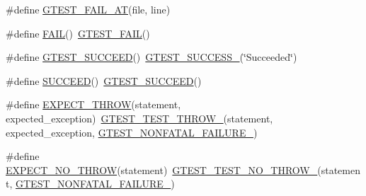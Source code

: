 \begin{DoxyCompactItemize}
\#define \mbox{\hyperlink{googletest-master_2googletest_2include_2gtest_2gtest_8h_acf5a3e2510baccc1a0eccb72da510d98}{G\+T\+E\+S\+T\+\_\+\+F\+A\+I\+L\+\_\+\+AT}}(file,  line)
\item 
\#define \mbox{\hyperlink{googletest-master_2googletest_2include_2gtest_2gtest_8h_a3e26a8d27caa386ed0ea7ce9d5b7c4ed}{F\+A\+IL}}()~\mbox{\hyperlink{_obj__test_2lib_2googletest-release-1_88_81_2googletest_2include_2gtest_2gtest_8h_a636231436707c30d6778f79ae96f5dc6}{G\+T\+E\+S\+T\+\_\+\+F\+A\+IL}}()
\item 
\#define \mbox{\hyperlink{googletest-master_2googletest_2include_2gtest_2gtest_8h_a2690441c38202728f4159ac2462d9720}{G\+T\+E\+S\+T\+\_\+\+S\+U\+C\+C\+E\+ED}}()~\mbox{\hyperlink{_obj__test_2lib_2googletest-release-1_88_81_2googletest_2include_2gtest_2internal_2gtest-internal_8h_abe012b550eb3807e8c49f7e161bd1567}{G\+T\+E\+S\+T\+\_\+\+S\+U\+C\+C\+E\+S\+S\+\_\+}}(\char`\"{}Succeeded\char`\"{})
\item 
\#define \mbox{\hyperlink{googletest-master_2googletest_2include_2gtest_2gtest_8h_a75adcdf89f69b0b615e395daafc315af}{S\+U\+C\+C\+E\+ED}}()~\mbox{\hyperlink{_obj__test_2lib_2googletest-release-1_88_81_2googletest_2include_2gtest_2gtest_8h_a2690441c38202728f4159ac2462d9720}{G\+T\+E\+S\+T\+\_\+\+S\+U\+C\+C\+E\+ED}}()
\item 
\#define \mbox{\hyperlink{googletest-master_2googletest_2include_2gtest_2gtest_8h_a789842b4475eed948e6fd18390d5a859}{E\+X\+P\+E\+C\+T\+\_\+\+T\+H\+R\+OW}}(statement,  expected\+\_\+exception)~\mbox{\hyperlink{_obj__test_2lib_2googletest-release-1_88_81_2googletest_2include_2gtest_2internal_2gtest-internal_8h_a3f71db93eaf30b0cfca9612b9ac32106}{G\+T\+E\+S\+T\+\_\+\+T\+E\+S\+T\+\_\+\+T\+H\+R\+O\+W\+\_\+}}(statement, expected\+\_\+exception, \mbox{\hyperlink{_obj__test_2lib_2googletest-release-1_88_81_2googletest_2include_2gtest_2internal_2gtest-internal_8h_a6cb7482cfa03661a91c698eb5895f642}{G\+T\+E\+S\+T\+\_\+\+N\+O\+N\+F\+A\+T\+A\+L\+\_\+\+F\+A\+I\+L\+U\+R\+E\+\_\+}})
\item 
\#define \mbox{\hyperlink{googletest-master_2googletest_2include_2gtest_2gtest_8h_a2743a1438137ad857aa3f9fec3ff67ec}{E\+X\+P\+E\+C\+T\+\_\+\+N\+O\+\_\+\+T\+H\+R\+OW}}(statement)~\mbox{\hyperlink{_obj__test_2lib_2googletest-release-1_88_81_2googletest_2include_2gtest_2internal_2gtest-internal_8h_a9a109d026b5a904646437d7570e13581}{G\+T\+E\+S\+T\+\_\+\+T\+E\+S\+T\+\_\+\+N\+O\+\_\+\+T\+H\+R\+O\+W\+\_\+}}(statement, \mbox{\hyperlink{_obj__test_2lib_2googletest-release-1_88_81_2googletest_2include_2gtest_2internal_2gtest-internal_8h_a6cb7482cfa03661a91c698eb5895f642}{G\+T\+E\+S\+T\+\_\+\+N\+O\+N\+F\+A\+T\+A\+L\+\_\+\+F\+A\+I\+L\+U\+R\+E\+\_\+}})

\end{DoxyCompactItemize}
